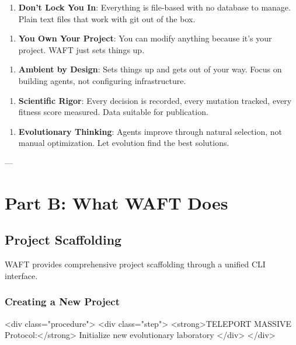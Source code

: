 \documentclass{article}
\begin{document}
\begin{itemize}
\begin{itemize}
\begin{itemize}
\begin{itemize}
\begin{itemize}
\begin{itemize}
\begin{enumerate}
\item \textbf{Don't Lock You In}: Everything is file-based with no database to manage. Plain text files that work with git out of the box.
\end{enumerate}

\begin{enumerate}
\item \textbf{You Own Your Project}: You can modify anything because it's your project. WAFT just sets things up.
\end{enumerate}

\begin{enumerate}
\item \textbf{Ambient by Design}: Sets things up and gets out of your way. Focus on building agents, not configuring infrastructure.
\end{enumerate}

\begin{enumerate}
\item \textbf{Scientific Rigor}: Every decision is recorded, every mutation tracked, every fitness score measured. Data suitable for publication.
\end{enumerate}

\begin{enumerate}
\item \textbf{Evolutionary Thinking}: Agents improve through natural selection, not manual optimization. Let evolution find the best solutions.
\end{enumerate}

---

\section{Part B: What WAFT Does}

\subsection{Project Scaffolding}

WAFT provides comprehensive project scaffolding through a unified CLI interface.

\subsubsection{Creating a New Project}

<div class="procedure">
    <div class="step">
        <strong>TELEPORT MASSIVE Protocol:</strong> Initialize new evolutionary laboratory
    </div>
</div>


\end{itemize}
\end{itemize}
\end{itemize}
\end{itemize}
\end{itemize}
\end{itemize}
\end{document}
